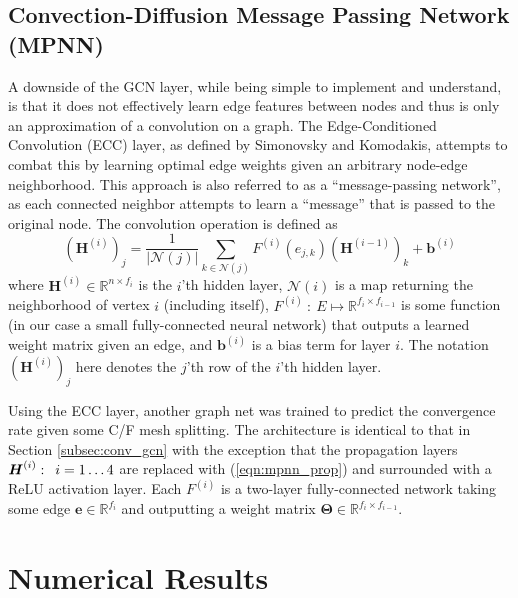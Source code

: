 \documentclass{siamart190516}
\newcommand{\abs}[1]{\left\lvert#1\right\rvert}
\newcommand{\mat}[1]{\bm{{#1}}}
\renewcommand{\vec}[1]{\bm{{#1}}}
\newcommand{\hquad}{\enskip}
\begin{document}
\subsection{Convection-Diffusion Message Passing Network (MPNN)}\label{subsec:conv_mpnn}
A downside of the GCN layer, while being simple to implement and understand, is that it does not effectively learn edge features between nodes and thus is only an approximation of a convolution on a graph.  The Edge-Conditioned Convolution (ECC) layer, as defined by Simonovsky and Komodakis\cite{ecc}, attempts to combat this by learning optimal edge weights given an arbitrary node-edge neighborhood.  This approach is also referred to as a ``message-passing network'', as each connected neighbor attempts to learn a ``message'' that is passed to the original node\cite{mpnn}.  The convolution operation is defined as
%
\begin{equation}\label{eqn:mpnn_prop}
  \left(\mat{H}^{(i)}\right)_j = \frac{1}{\abs{\mathcal{N}\left(j\right)}} \sum_{k\in\mathcal{N}\left(j\right)} F^{(i)}\left(e_{j,k}\right)\left(\mat{H}^{(i-1)}\right)_k + \vec{b}^{(i)}
\end{equation}
%
where $\mat{H}^{\left(i\right)} \in \mathbb{R}^{n \times f_i}$ is the $i$'th hidden layer, $\mathcal{N}\left(i\right)$ is a map returning the neighborhood of vertex $i$ (including itself), $F^{(i)} \: : \: E \mapsto \mathbb{R}^{f_i \times f_{i-1}}$ is some function (in our case a small fully-connected neural network) that outputs a learned weight matrix given an edge, and $\vec{b}^{(i)}$ is a bias term for layer $i$.  The notation $\left(\mat{H}^{\left(i\right)}\right)_j$ here denotes the $j$'th row of the $i$'th hidden layer.

Using the ECC layer, another graph net was trained to predict the convergence rate given some C/F mesh splitting.  The architecture is identical to that in Section \ref{subsec:conv_gcn} with the exception that the propagation layers $\mat{H}^{(i)}: \hquad i=1\ldots 4$ are replaced with (\ref{eqn:mpnn_prop}) and surrounded with a ReLU activation layer.  Each $F^{(i)}$ is a two-layer fully-connected network taking some edge $\vec{e} \in \mathbb{R}^{f_i}$ and outputting a weight matrix $\mat{\Theta} \in \mathbb{R}^{f_i\times f_{i-1}}$.


\section{Numerical Results}\label{sec:num}
\end{document}
